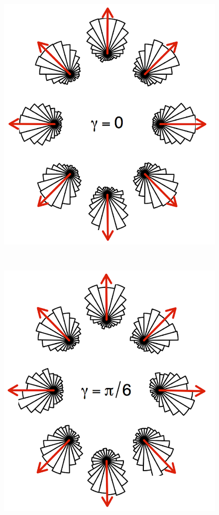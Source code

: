 \begin{figure}[h]
\begin{minipage}[]{0.3\textwidth}
    \includegraphics[width=\textwidth]{img/khuong_0}
\end{minipage}%
\begin{minipage}[]{0.05\textwidth}
~
\end{minipage}%
\begin{minipage}[]{0.3\textwidth}
    \includegraphics[width=\textwidth]{img/khuong_pi_div_6}

\end{minipage}
\end{figure}
